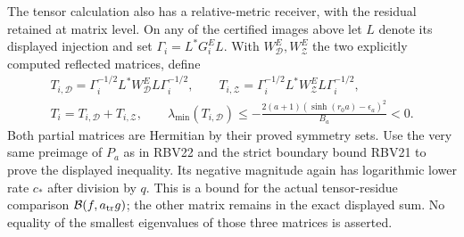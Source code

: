 The tensor calculation also has a relative-metric receiver, with
the residual retained at matrix level. On any of the certified
images above let $L$ denote its displayed injection and set
$\Gamma_i=L^*G_i^EL$. With $W_{\mathcal D}^E,W_{\mathcal Z}^E$
the two explicitly computed reflected matrices, define
\[
\begin{gathered}
T_{i,\mathcal D}=\Gamma_i^{-1/2}L^*W_{\mathcal D}^EL\Gamma_i^{-1/2},
\qquad T_{i,\mathcal Z}=\Gamma_i^{-1/2}L^*W_{\mathcal Z}^EL\Gamma_i^{-1/2},\\
T_i=T_{i,\mathcal D}+T_{i,\mathcal Z},\qquad
\boxed{\lambda_{\min}(T_{i,\mathcal D})
\le-\frac{2(a+1)(\sinh(r_0a)-\epsilon_a)^2}{B_a}<0.}
\end{gathered}\tag{RBV36}
\]
Both partial matrices are Hermitian by their proved symmetry sets.
Use the very same preimage of $P_a$ as in RBV22 and the strict
boundary bound RBV21 to prove the displayed inequality. Its
negative magnitude again has logarithmic lower rate $c_*$ after
division by $q$. This is a bound for the actual tensor-residue
comparison $\mathcal B(f,a_{\rm tr}g)$; the other matrix remains
in the exact displayed sum. No equality of the smallest eigenvalues
of those three matrices is asserted.
\endgroup
